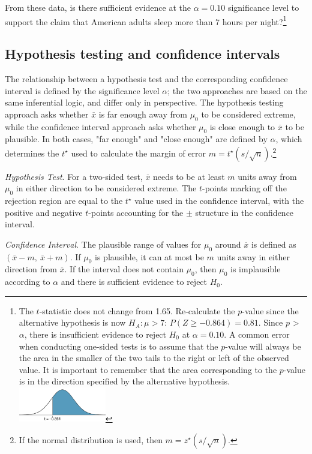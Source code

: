 \begin{exercise}
	From these data, is there sufficient evidence at the $\alpha = 0.10$ significance level to support the claim that American adults sleep more than 7 hours per night?\footnote{The $t$-statistic does not change from 1.65. Re-calculate the $p$-value since the alternative hypothesis is now $H_A: \mu > 7$: $P(Z \geq -0.864) = 0.81$. Since $p$ > $\alpha$, there is insufficient evidence to reject $H_0$ at $\alpha = 0.10$. A common error when conducting one-sided tests is to assume that the $p$-value will always be the area in the smaller of the two tails to the right or left of the observed value. It is important to remember that the area corresponding to the $p$-value is in the direction specified by the alternative hypothesis.\\
	\includegraphics[width=0.3\textwidth]{ch_inference_foundations_oi_biostat/figures/pValueSleep/pValueSleepEx}}
\end{exercise}

\subsection{Hypothesis testing and confidence intervals}

The relationship between a hypothesis test and the corresponding confidence interval is defined by the significance level $\alpha$; the two approaches are based on the same inferential logic, and differ only in perspective. The hypothesis testing approach asks whether $\overline{x}$ is far enough away from $\mu_0$ to be considered extreme, while the confidence interval approach asks whether $\mu_0$ is close enough to $\overline{x}$ to be plausible. In both cases, "far enough" and "close enough" are defined by $\alpha$, which determines the $t^{\star}$ used to calculate the margin of error $m = t^{\star} (s/\sqrt{n}) $.\footnote{If the normal distribution is used, then $m = z^{\star} (s/\sqrt{n})$.}

\begin{list}{}{}
	\item \textit{Hypothesis Test}. For a two-sided test,  $\overline{x}$ needs to be at least $m$ units away from $\mu_0$ in either direction to be considered extreme. The $t$-points marking off the rejection region are equal to the $t^\star$ value used in the confidence interval, with the positive and negative $t$-points accounting for the $\pm$ structure in the confidence interval.
	
	\item \textit{Confidence Interval}. The plausible range of values for $\mu_0$ around $\overline{x}$ is defined as $(\overline{x} - m, \ \overline{x} + m)$. If $\mu_0$ is plausible, it can at most be $m$ units away in either direction from $\overline{x}$. If the interval does not contain $\mu_0$, then $\mu_0$ is implausible according to $\alpha$ and there is sufficient evidence to reject $H_0$.
\end{list}

